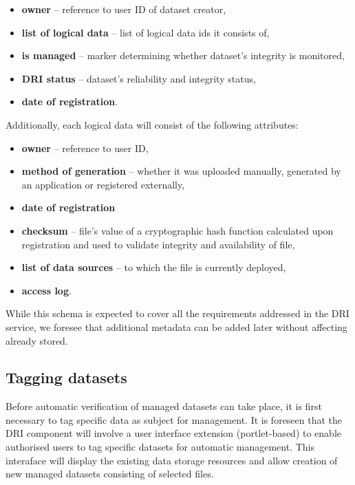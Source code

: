 \begin{itemize}
	\item \textbf{owner} -- reference to user ID of dataset creator,
	\item \textbf{list of logical data} -- list of logical data ids it consists of,
	\item \textbf{is managed} -- marker determining whether dataset's integrity
	is monitored,
	\item \textbf{DRI status} -- dataset's reliability and integrity status,
	\item \textbf{date of registration}.
\end{itemize}

\noindent
Additionally, each logical data will consist of the following attributes:

\begin{itemize}
	\item \textbf{owner} -- reference to user ID,
	\item \textbf{method of generation} -- whether it was uploaded manually, 
	generated by an application or registered externally,
	\item \textbf{date of registration}
	\item \textbf{checksum} -- file's value of a cryptographic hash function
	calculated upon registration and used to validate integrity and 
	availability of file,
	\item \textbf{list of data sources} -- to which the file is currently
	deployed,
	\item \textbf{access log}.
\end{itemize}

While this schema is expected to cover all the requirements addressed in the
DRI service, we foresee that additional metadata can be added later without
affecting already stored.

\subsection{Tagging datasets}
Before automatic verification of managed datasets can take place, it is first
necessary to tag specific data as subject for management. It is foreseen that
the DRI component will involve a user interface extension (portlet-based) to
enable authorised users to tag specific datasets for automatic management. This
interaface will display the existing data storage resources and allow creation
of new managed datasets consisting of selected files.\\


